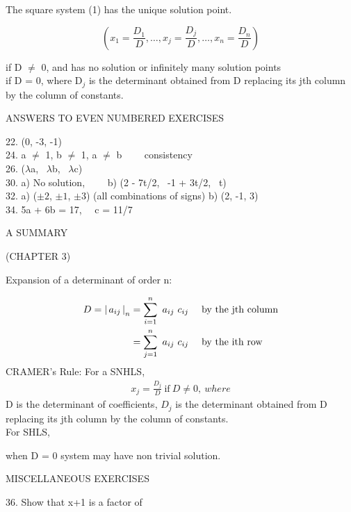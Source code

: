 \documentclass[11pt]{amsbook}
\begin{document}
\begin{thm}
	The square system (1) has the unique solution point.

	\[
		\left(
			x_1 = \frac{D_1}{D} , \dots ,
			x_j = \frac{D_j}{D} , \dots ,
			x_n = \frac{D_n}{D}
		\right)
	\]

	if D \(\neq\) 0, and has no solution or infinitely many solution points
	\\
	if D = 0, where D\(_j\) is the determinant obtained from D replacing its jth column by the column of constants.
\end{thm}
\centerline{ANSWERS TO EVEN NUMBERED EXERCISES} 
\begin{flushleft}
22. (0, -3, -1)\\
24. a $\neq$ 1, b $\neq$ 1, a $\neq$ b \ \ \ \ consistency\\
26. ($\lambda$a, \ $\lambda$b, \ $\lambda$c)\\
30. a) No solution, \ \ \ \ b) (2 - 7t/2, \ -1 + 3t/2, \ t)\\
32. a) ($\pm2$, $\pm1$, $\pm3$) (all combinations of signs) b) (2, -1, 3) \\
34. 5a + 6b = 17, \ \ c = 11/7 \\
\end{flushleft}

\centerline{A SUMMARY}
\centerline{(CHAPTER 3)}
\begin{framed}
\begin{flushleft}
Expansion of a determinant of order n:
\end{flushleft}
\begin{align*}
D = \left \lvert \, a_{ij} \, \right \rvert_{n}
& = \sum_{i = 1}^n \ a_{ij} \ c_{ij} \ \ \ \ \text{by the jth column} \\
& = \sum_{j = 1}^n \ a_{ij} \ c_{ij} \ \ \ \ \text{by the ith row} \\
\end{align*}
CRAMER's Rule: For a SNHLS,
\begin{align*}
    x_{j} = \frac{D_{j}}{D} \ \text{if} \ D \neq 0,\ where
\end{align*}
D is the determinant of coefficients, $D_{j}$ is the determinant obtained from D replacing its jth column by the column of constants.\\
For SHLS,\\
\centerline{when D = 0 system may have non trivial solution.}
\end{framed}
\centerline{MISCELLANEOUS EXERCISES}
\begin{flushleft}
36. Show that x+1 is a factor of
\end{flushleft}
\end{document}
